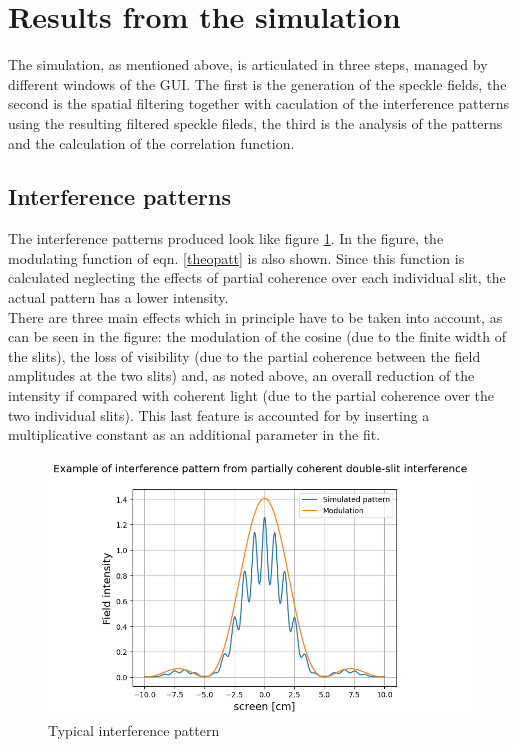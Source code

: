 \section{Results from the simulation}


The simulation, as mentioned above, is articulated in three steps, managed by different windows of the GUI. The first is the generation of the speckle fields, 
the second is the spatial filtering together with caculation of the interference patterns using the resulting filtered speckle fileds, the third is the analysis of 
the patterns and the calculation of the correlation function.



\subsection{Interference patterns}

The interference patterns produced look like figure \ref{patt}. In the figure, the modulating function of eqn. \eqref{theopatt} is also shown. Since this 
function is calculated neglecting the effects of partial coherence over each individual slit, the actual pattern has a lower intensity. \\

There are three main effects which in principle have to be taken into account, as can be seen in the figure: 
the modulation of the cosine (due to the finite width of the slits), the loss of visibility (due to the partial coherence between the field amplitudes at the two slits) 
and, as noted above, 
an overall reduction of the intensity if compared with coherent light (due to the partial coherence over the two individual slits). This last feature is accounted 
for by inserting a multiplicative constant as an additional parameter in the fit.
\begin{figure}[!ht]
    \centering
    \includegraphics[width = .8\textwidth]{Img/output.png}
    \caption{Typical interference pattern}
    \label{patt}
\end{figure}

